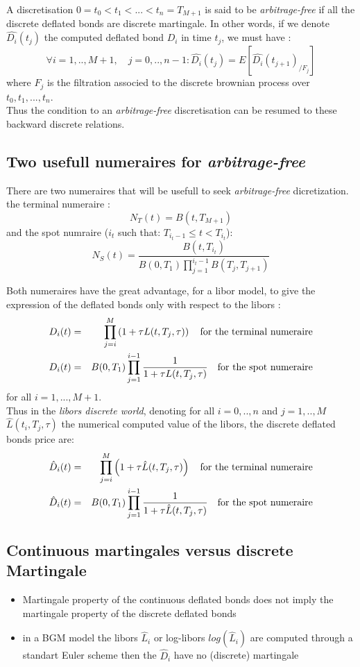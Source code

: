 \documentclass[10pt,a4paper,english,landscape]{slides}
\newcommand{\ba}{\begin{eqnarray}}
\newcommand{\ea}{\end{eqnarray}}
\begin{document}
 A discretisation $0=t_0<t_1<...<t_n=T_{M+1}$ is said to be
{\it arbitrage-free} if all the discrete deflated bonds are discrete
martingale. In other words, if we denote $\hat{D_i}(t_j)$ the computed
deflated bond $D_i$ in time $t_j$, we must have :
\begin{equation}
\label{def}
\forall i=1,..,M+1, \quad j=0,..,n-1
:\hat{D_i}(t_j)=E\left[\hat{D_i}(t_{j+1}) _{/{F}_j}\right]
\end{equation}
where ${F}_j$ is the filtration  associed to the discrete brownian
process over ${t_0, t_1, ...,t_n}$.\\

 Thus the condition to an {\it arbitrage-free}
discretisation can be resumed to these backward discrete relations.

\subsection{Two usefull numeraires for {\it arbitrage-free}}
There are two numeraires that will be usefull to seek {\it
  arbitrage-free} dicretization.\\
the terminal numeraire :
$$N_T(t)=B(t,T_{M+1})$$
and the spot numraire ($i_t$ such that: $T_{i_t-1} \le t<T_{i_t}$):
$$N_S(t)=\frac{B(t,T_{i_t})}{B(0,T_1) \prod_{j=1}^{i_t-1}B(T_j,T_{j+1})}$$

Both numeraires have the great advantage, for a libor model, to give the
expression of the deflated bonds  only with respect to the libors :
\ba
\label{DtfL}
D_i(t)&=&\prod_{j=i}^{M}\left(1+\tau L(t,T_j,\tau)\right)\quad
\hbox{for the terminal numeraire}\\
\label{DsfL}
D_i(t)&=&B(0,T_1)\prod_{j=1}^{i-1}\frac{1}{1+\tau L(t,T_j,\tau)}\quad
\hbox{for the spot numeraire}
\ea
for all $i=1,...,M+1$.\\
Thus in the {\it libors discrete world}, denoting for all $i=0,..,n$
and $j=1,..,M$
$\hat{L}(t_i,T_j,\tau)$ the numerical computed value of the
libors, the discrete deflated bonds price are: 
\ba
\hat{D}_i(t)&=&\prod_{j=i}^{M}\left(1+\tau \hat{L}(t,T_j,\tau)\right)\quad
\hbox{for the terminal numeraire}\\
\hat{D}_i(t)&=&B(0,T_1)\prod_{j=1}^{i-1}\frac{1}{1+\tau \hat{L}(t,T_j,\tau)}\quad
\hbox{for the spot numeraire}
\ea
\subsection{Continuous martingales versus discrete Martingale}
\begin{itemize}
\item Martingale property of the continuous deflated bonds does not imply the martingale property of the discrete deflated bonds
\item in a BGM model the libors $\hat{L}_i$ or log-libors $log(\hat{L}_i)$ are computed through a standart Euler scheme then the $\hat{D}_i$ have no (discrete) martingale
\end{itemize}
\end{document}
